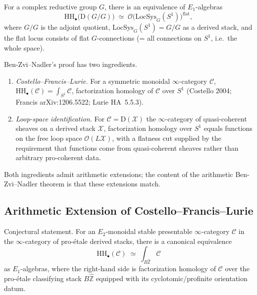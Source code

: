 \begin{theorem}
\label{v4-arith:bzn:thm:BZN-classical}
For a complex reductive group \(G\),
there is an equivalence of \(E_{1}\)-algebras
\begin{equation}
\mathrm{HH}_{\bullet}\bigl(\mathrm{D}(G/G)\bigr)\;\simeq\;\mathcal{O}\bigl(\mathrm{LocSys}_{G}(S^{1})\bigr)^{\mathrm{flat}},
\end{equation}
where \(G/G\) is the adjoint quotient, \(\mathrm{LocSys}_{G}(S^{1})=G/G\)
as a derived stack, and the flat locus consists of flat
\(G\)-connections (= all connections on \(S^{1}\), i.e.\ the whole
space).
\end{theorem}

\begin{remark}
\label{v4-arith:bzn:rem:BZN-classical-structure}
Ben-Zvi--Nadler's proof has two ingredients.
\begin{enumerate}
\item \emph{Costello--Francis--Lurie.} For a symmetric monoidal
\(\infty\)-category \(\mathcal{C}\), \(\mathrm{HH}_{\bullet}(\mathcal{C})=\int_{S^{1}}\mathcal{C}\),
factorization homology of \(\mathcal{C}\) over \(S^{1}\)
(Costello 2004; Francis arXiv:1206.5522; Lurie HA~5.5.3).
\item \emph{Loop-space identification.} For \(\mathcal{C}=\mathrm{D}(\mathcal{X})\)
the \(\infty\)-category of quasi-coherent sheaves on a derived
stack \(\mathcal{X}\), factorization homology over \(S^{1}\) equals
functions on the free loop space
\(\mathcal{O}(L\mathcal{X})\), with a flatness cut supplied by the
requirement that functions come from quasi-coherent sheaves
rather than arbitrary pro-coherent data.
\end{enumerate}
Both ingredients admit arithmetic extensions; the content of the
arithmetic Ben-Zvi--Nadler theorem is that these extensions match.
\end{remark}

\subsection{Arithmetic Extension of Costello--Francis--Lurie}

\begin{theorem}
\label{v4-arith:bzn:thm:arith-fact-homology}
Conjectural statement. For an \(E_{2}\)-monoidal stable presentable
\(\infty\)-category \(\mathcal{C}\) in the \(\infty\)-category of
pro-\'etale derived stacks, there is a canonical equivalence
\begin{equation}
\mathrm{HH}_{\bullet}(\mathcal{C})\;\simeq\;\int_{B\widehat{\mathbb{Z}}}\mathcal{C}
\end{equation}
as \(E_{1}\)-algebras, where the right-hand side is factorization
homology of \(\mathcal{C}\) over the pro-\'etale classifying stack
\(B\widehat{\mathbb{Z}}\) equipped with its cyclotomic/profinite
orientation datum.
\end{theorem}

